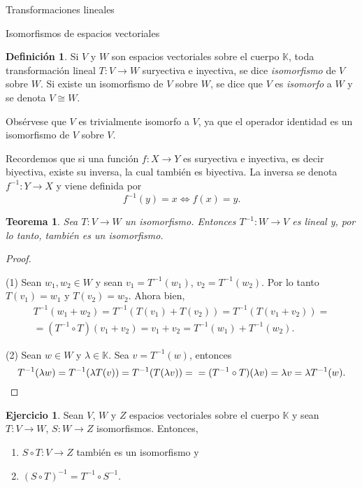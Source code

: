 \documentclass[a4paper,12pt,twoside,spanish]{amsbook}
\newtheorem{teorema}{Teorema}[section]
\theoremstyle{definition}
\newtheorem{definicion}{Definici\'on}[section]
\newtheorem{ejercicio}{Ejercicio}[section]
\theoremstyle{remark}
\newcommand{\K}{\mathbb K}
\begin{document}
\begin{chapter}{Transformaciones lineales}
\begin{section}{Isomorfismos de espacios vectoriales}
			

		\begin{definicion}
			Si $V$ y $W$ son espacios vectoriales sobre el cuerpo $\K$, toda transformación	lineal $T:V \to W$ suryectiva e inyectiva, se dice \textit{isomorfismo} de $V$ sobre $W$. Si existe un isomorfismo de $V$ sobre $W$, se dice que $V$ es \textit{isomorfo} a $W$ y se denota $V \cong W$.
		\end{definicion}
		
		
		
		Obsérvese que $V$ es trivialmente isomorfo a $V$, ya que el operador identidad es un isomorfismo de $V$ sobre $V$. 
			
		Recordemos que si una función $f: X \to Y$ es suryectiva e inyectiva, es decir biyectiva, existe su inversa, la cual también es biyectiva. La inversa se denota $f^{-1}: Y \to X$ y viene definida por
		$$
		f^{-1}(y) = x \Leftrightarrow f(x) =y.
		$$ 
		
		\begin{teorema}
			Sea $T:V \to W$ un isomorfismo. Entonces $T^{-1}: W \to V$ es lineal y, por lo tanto, también es un isomorfismo.
		\end{teorema}
		\begin{proof}
			\
			
			(1) Sean $w_1, w_2 \in W$ y sean $v_1 = T^{-1}(w_1) $, $v_2 = T^{-1}(w_2)$. Por lo tanto $T(v_1) = w_1$ y $T(v_2) = w_2$. Ahora bien,
			\begin{multline*}
				T^{-1}(w_1+w_2) = 	T^{-1}(T(v_1)+T(v_2))  = 	T^{-1}(T(v_1+v_2)) = \\ =(T^{-1}\circ T)(v_1+v_2) = v_1+v_2 = T^{-1}(w_1)+ T^{-1}(w_2). 
			\end{multline*}    
			
			(2) Sean $w \in W$ y $\lambda  \in \K$. Sea $v = T^{-1}(w)$, entonces
			\begin{equation*}
			T^{-1}(\lambda w) = 	T^{-1}(\lambda T(v))  = 	T^{-1}(T(\lambda v)) = \\ =(T^{-1}\circ T)(\lambda v) = \lambda v = \lambda  T^{-1}(w). 
			\end{equation*}
				\end{proof}
		
		
		\begin{ejercicio} 
			Sean $V$, $W$ y $Z$ espacios vectoriales sobre el cuerpo $\K$ y sean $T:V \to W$, $S:W \to Z$ isomorfismos. Entonces, 
			\begin{enumerate}
				\item $S\circ T:V \to Z$  también es un isomorfismo y
				\item 	$(S\circ T)^{-1} = T^{-1}\circ S^{-1}$.
			\end{enumerate}
		\end{ejercicio}
		

\end{section}
\end{chapter}
\end{document}
